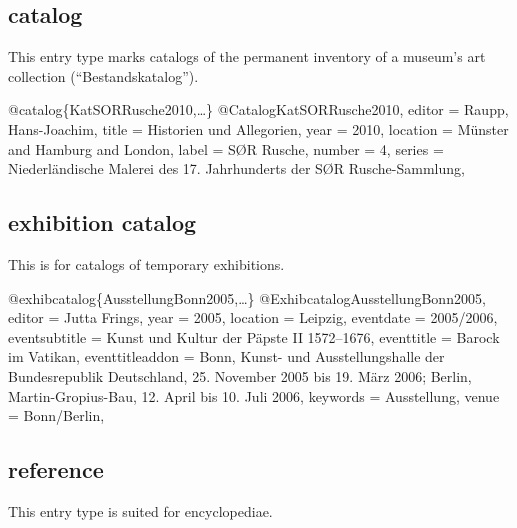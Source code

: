 \documentclass[a4paper,
10pt,
ngerman,
english
]{ltxdoc}
\begin{document}
\subsection{catalog}
This entry type marks catalogs of the permanent inventory of a museum's art collection (\enquote{Bestandskatalog}).
\begin{bibexample}[label=KatSORRusche2010]{{@}catalog\{KatSORRusche2010,…\}}
@Catalog{KatSORRusche2010,
  editor   = {Raupp, Hans-Joachim},
  title    = {Historien und Allegorien},
  year     = {2010},
  location = {Münster and Hamburg and London},
  label    = {S{{\O}}R Rusche},
  number   = {4},
  series   = {Niederländische Malerei des 17. Jahrhunderts der S{{\O}}R Rusche-Sammlung},
}
\end{bibexample}

\subsection{exhibition catalog}
This is for catalogs of temporary exhibitions.
\begin{bibexample}[label=AusstellungBonn2005]{{@}exhibcatalog\{AusstellungBonn2005,…\}}
@Exhibcatalog{AusstellungBonn2005,
  editor          = {Jutta Frings},
  year            = {2005},
  location        = {Leipzig},
  eventdate       = {2005/2006},
  eventsubtitle   = {Kunst und Kultur der Päpste II 1572--1676},
  eventtitle      = {Barock im Vatikan},
  eventtitleaddon = {Bonn, Kunst- und Ausstellungshalle der Bundesrepublik Deutschland, 25. November 2005 bis 19. März 2006; Berlin, Martin-Gropius-Bau, 12. April bis 10. Juli 2006},
  keywords        = {Ausstellung},
  venue           = {Bonn/Berlin},
}
\end{bibexample}

\subsection{reference}
This entry type is suited for encyclopediae. 
\end{document}

